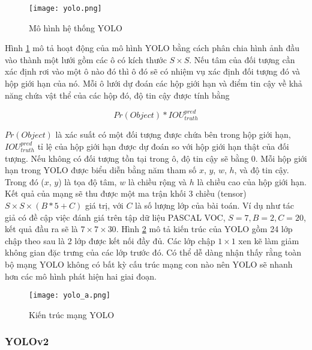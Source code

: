 \documentclass[../the.tex]{subfiles}
\begin{document}
\begin{figure}[H]
	\centering
	\texttt{[image: yolo.png]}
	\caption{Mô hình hệ thống YOLO}
	\label{fig:yolo}
\end{figure}

{\fontsize{13}{12} \selectfont

Hình \ref{fig:yolo} mô tả hoạt động của mô hình YOLO bằng cách phân chia hình ảnh đầu vào thành một lưới gồm các ô có kích thước
$S \times S$. Nếu tâm của đối tượng cần xác định rơi vào một ô nào đó thì ô đó sẽ có nhiệm vụ xác định đối tượng đó và hộp giới hạn của nó.
Mỗi ô lưới dự đoán các hộp giới hạn và điểm tin cậy về khả năng chứa vật thể của các hộp đó, độ tin cậy được tính bằng

\begin{equation}
	Pr(Object) * IOU^{pred}_{truth}
\end{equation}

$Pr(Object)$ là xác suất có một đối tượng được chứa bên trong hộp giới hạn, $IOU^{pred}_{truth}$ tỉ lệ của hộp giới hạn được dự đoán so với hộp giới hạn thật của đối tượng.
Nếu không có đối tượng tồn tại trong ô, độ tin cậy sẽ bằng 0. Mỗi hộp giới hạn trong YOLO được biểu diễn bằng năm tham số
$x$, $y$, $w$, $h$, và độ tin cậy. Trong đó ($x$, $y$) là tọa độ tâm, $w$ là chiều rộng và $h$ là chiều cao của hộp giới hạn.
Kết quả của mạng sẽ thu được một ma trận khối 3 chiều (tensor)  $S \times S \times (B * 5 + C)$ giá trị, với
$C$ là số lượng lớp của bài toán. Ví dụ như tác giả có đề cập việc đánh giá trên tập dữ liệu PASCAL VOC, $S = 7, B = 2, C = 20$, kết quả đầu ra sẽ là $7 \times 7 \times 30$.
Hình \ref{fig:mangyolo} mô tả kiến trúc của YOLO gồm 24 lớp chập theo sau là 2 lớp được kết nối đầy đủ. Các lớp chập $1 \times 1$ xen kẽ làm giảm không gian đặc trưng của các lớp trước đó.
Có thể dễ dàng nhận thấy rằng toàn bộ mạng YOLO không có bất kỳ cấu trúc mạng con nào nên YOLO sẽ nhanh hơn các mô hình phát hiện hai giai đoạn.

}

\begin{figure}[H]
	\centering
	\texttt{[image: yolo\_a.png]}
	\caption{Kiến trúc mạng YOLO}
	\label{fig:mangyolo}
\end{figure}
\bigskip

\subsubsection{YOLOv2}
\end{document}
